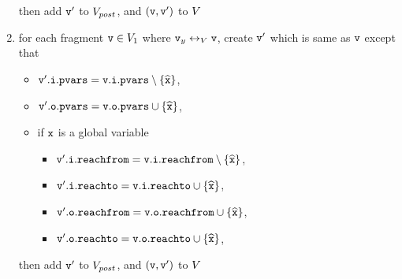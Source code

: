\begin{enumerate}
\begin{itemize}
\begin{itemize}
\end{itemize}
\end{itemize}
then add $\mathtt{v}'$ to $V_{post}$, and $(\mathtt{v},\mathtt{v}')$ to $V$
\item for each fragment $\mathtt{v} \in V_1$ where $\mathtt{v}_y \leftrightarrow_{V} \mathtt{v}$, create $\mathtt{v}'$ which is same as $\mathtt{v}$ except that
\begin{itemize} 
\item $\mathtt{v}'.\mathtt{i}.\mathtt{pvars} = \mathtt{v}.\mathtt{i}.\mathtt{pvars} \setminus \left\{\widehat{\mathtt{x}}\right\}$,
\item $\mathtt{v}'.\mathtt{o}.\mathtt{pvars} = \mathtt{v}.\mathtt{o}.\mathtt{pvars} \cup \left\{\widehat{\mathtt{x}}\right\}$,
\item if $\tt x$ is a global variable
\begin{itemize}
\item $\mathtt{v}'.\mathtt{i}.\mathtt{reachfrom} = \mathtt{v}.\mathtt{i}.\mathtt{reachfrom} \setminus \left\{\widehat{\mathtt{x}}\right\}$,
\item $\mathtt{v}'.\mathtt{i}.\mathtt{reachto} = \mathtt{v}.\mathtt{i}.\mathtt{reachto} \cup \left\{\widehat{\mathtt{x}}\right\}$,
 \item $\mathtt{v}'.\mathtt{o}.\mathtt{reachfrom} = \mathtt{v}.\mathtt{o}.\mathtt{reachfrom} \cup \left\{\widehat{\mathtt{x}}\right\}$,
 \item $\mathtt{v}'.\mathtt{o}.\mathtt{reachto} = \mathtt{v}.\mathtt{o}.\mathtt{reachto} \cup \left\{\widehat{\mathtt{x}}\right\}$,
\end{itemize}
\end{itemize}
then add $\mathtt{v}'$ to $V_{post}$, and $(\mathtt{v},\mathtt{v}')$ to $V$


\end{enumerate}
